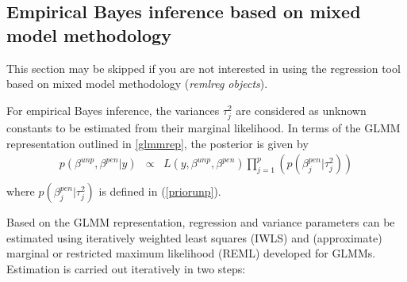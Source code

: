 \documentclass[11pt,a4paper,twoside]{bayesxarticle}
\begin{document}
\subsection{Empirical Bayes inference based on mixed model methodology}
\label{glmmmeth}

This section may be skipped if you are not interested in using the
regression tool based on mixed model methodology ({\em remlreg
objects}).

For empirical Bayes inference, the variances $\tau^2_j$ are
considered as unknown constants to be estimated from their marginal
likelihood. In terms of the GLMM representation outlined in
\autoref{glmmrep}, the posterior is given by
\begin{equation}
\label{posterior2}
\begin{array}{lll}
 p(\beta^{unp},\beta^{pen}|y) & \propto & L(y,\beta^{unp},\beta^{pen})
\displaystyle \prod_{j=1}^p \left( p(\beta_j^{pen}|\tau_j^2)  \right) \\
 \end{array}
\end{equation}
where $p(\beta_j^{pen}|\tau_j^2)$ is defined in (\ref{priorunp}).

Based on the GLMM representation, regression and variance parameters
can be estimated using iteratively weighted least squares (IWLS) and
(approximate) marginal or restricted maximum likelihood (REML)
developed for GLMMs. Estimation is carried out iteratively in two
steps:
\end{document}
